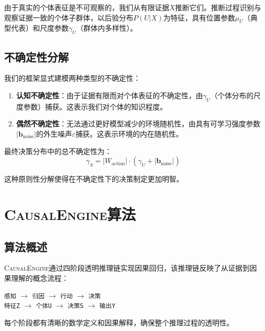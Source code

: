 \documentclass[conference]{IEEEtran}
\newcommand{\causalengine}{\textsc{CausalEngine}}
\begin{document}
\begin{CJK}{UTF8}{gbsn}
由于真实的个体表征是不可观察的，我们从有限证据$X$推断它们。推断过程识别与观察证据一致的个体子群体，以后验分布$P(U|X)$为特征，具有位置参数$\mu_U$（典型代表）和尺度参数$\gamma_U$（群体内多样性）。

\subsection{不确定性分解}

我们的框架显式建模两种类型的不确定性：

\begin{enumerate}
\item \textbf{认知不确定性}：由于证据有限而对个体表征的不确定性，由$\gamma_U$（个体分布的尺度参数）捕获。这表示我们对个体的知识程度。

\item \textbf{偶然不确定性}：无法通过更好模型减少的环境随机性，由具有可学习强度参数$|\mathbf{b}_{\text{noise}}|$的外生噪声$\varepsilon$捕获。这表示环境的内在随机性。
\end{enumerate}

最终决策分布中的总不确定性为：
\begin{equation}
\gamma_S = |W_{\text{action}}| \cdot (\gamma_U + |\mathbf{b}_{\text{noise}}|)
\end{equation}

这种原则性分解使得在不确定性下的决策制定更加明智。

\section{\causalengine{}算法}
\label{sec:algorithm}

\subsection{算法概述}

\causalengine{}通过四阶段透明推理链实现因果回归，该推理链反映了从证据到因果理解的概念流程：

\begin{center}
\texttt{感知} $\rightarrow$ \texttt{归因} $\rightarrow$ \texttt{行动} $\rightarrow$ \texttt{决策}\\
\texttt{特征Z} $\rightarrow$ \texttt{个体U} $\rightarrow$ \texttt{决策S} $\rightarrow$ \texttt{输出Y}
\end{center}

每个阶段都有清晰的数学定义和因果解释，确保整个推理过程的透明性。


\end{CJK}
\end{document}
